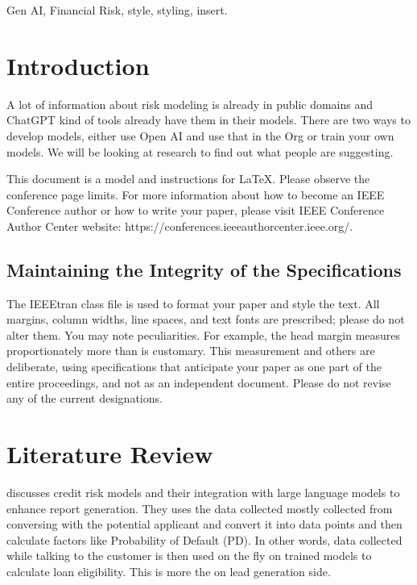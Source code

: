 \documentclass[conference]{IEEEtran}
\begin{document}
\begin{IEEEkeywords}
Gen AI, Financial Risk, style, styling, insert.
\end{IEEEkeywords}

\section{Introduction}
A lot of information about risk modeling is already in public domains and ChatGPT kind of tools already have them in their models.
There are two ways to develop models, either use Open AI and use that in the Org or train your own models.
We will be looking at research to find out what people are suggesting.

This document is a model and instructions for \LaTeX.
Please observe the conference page limits. For more information about how to become an IEEE Conference author or how to write your paper, please visit   IEEE Conference Author Center website: https://conferences.ieeeauthorcenter.ieee.org/.

\subsection{Maintaining the Integrity of the Specifications}

The IEEEtran class file is used to format your paper and style the text. All margins, 
column widths, line spaces, and text fonts are prescribed; please do not 
alter them. You may note peculiarities. For example, the head margin
measures proportionately more than is customary. This measurement 
and others are deliberate, using specifications that anticipate your paper 
as one part of the entire proceedings, and not as an independent document. 
Please do not revise any of the current designations.

\section{Literature Review}


\textcite{teixeiraEnhancingCreditRisk2023} discusses credit risk models and their integration with large language models to enhance report generation. They uses the data collected mostly collected from conversing with the potential applicant and convert it into data points and then calculate factors like Probability of Default (PD). In other words, data collected while talking to the customer is then used on the fly on trained models to calculate loan eligibility. This is more the on lead generation side.
\end{document}
